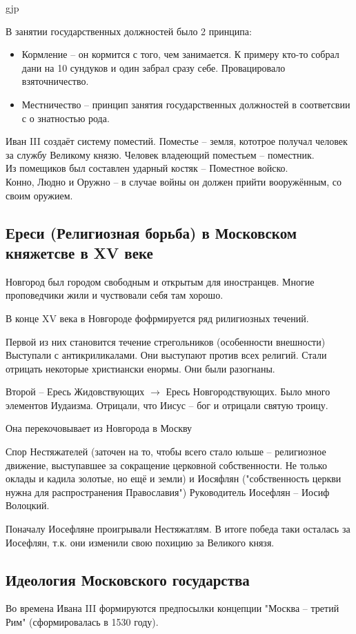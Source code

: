gjp	 \documentclass[12pt,a4paper]{article}
\begin{document}
В занятии государственных должностей было 2 принципа:
\begin{itemize}
	\item Кормление -- он кормится с того, чем занимается. К примеру кто-то собрал дани на 10 сундуков и один забрал сразу себе. Провацировало взяточничество.
	\item Местничество -- принцип занятия государственных должностей в соответсвии с о знатностью рода.
\end{itemize}

Иван III создаёт систему поместий. Поместье -- земля, кототрое получал человек за службу Великому князю. Человек владеющий поместьем -- поместник.\\
Из помещиков был составлен ударный костяк -- Поместное войско.\\
Конно, Людно и Оружно -- в случае войны он должен прийти вооружённым, со своим оружием.\\
\subsection{Ереси (Религиозная борьба) в Московском княжетсве в XV веке}
Новгород был городом свободным и открытым для иностранцев. Многие проповедчики жили и чуствовали себя там хорошо. 

В конце XV века в Новгороде фофрмируется ряд рилигиозных течений.

Первой из них становится течение стрегольников (особенности внешности)
Выступали с антикриликалами. Они выступают против всех религий.
Стали отрицать некоторые христиански енормы. Они были разогнаны.

Второй -- Ересь Жидовствующих $\rightarrow$ Ересь Новгородствующих. Было много элементов Иудаизма. Отрицали, что Иисус -- бог и отрицали святую троицу.

Она перекочовывает из Новгорода в Москву

 Спор Нестяжателей (заточен на то, чтобы всего стало юльше -- религиозное движение, выступавшее за сокращение церковной собственности. Не только оклады и кадила золотые, но ещё и земли) и Иосяфлян ("собственность церкви нужна для распространения Православия")
 Руководитель Иосефлян -- Иосиф Волоцкий.
 
 Поначалу Иосефляне проигрывали Нестяжатлям. В итоге победа таки осталась за Иосефлян, т.к. они изменили свою похицию за Великого князя.
 
 \subsection{Идеология Московского государства}
 Во времена Ивана III формируются предпосылки концепции "Москва -- третий Рим" (сформировалась в 1530 году). 
 
\end{document}
